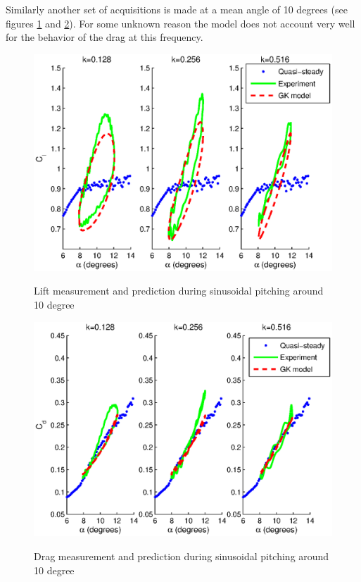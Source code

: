 \FloatBarrier

\par Similarly another set of acquisitions is made at a mean angle of 10 degrees (see figures \ref{fig:Pitching_allcases_GK_Cl_10} and \ref{fig:Pitching_allcases_GK_Cd_10}).
For some unknown reason the model does not account very well for the behavior of the drag at this frequency.

\begin{figure}[h]
  \begin{center}
    \scalebox{0.85}  
    {\includegraphics{./Figures/Pitching_allcases_GK_CL_10_amp_2.eps}}
  \end{center}
  \caption{Lift measurement and prediction during sinusoidal pitching around 10 degree} 
  \label{fig:Pitching_allcases_GK_Cl_10}
\end{figure}

\begin{figure}[h]
  \begin{center}
    \scalebox{0.85}  
    {\includegraphics{./Figures/Pitching_allcases_GK_CD_10_amp_2.eps}}
  \end{center}
  \caption{Drag measurement and prediction during sinusoidal pitching around 10 degree} 
  \label{fig:Pitching_allcases_GK_Cd_10}
\end{figure}

